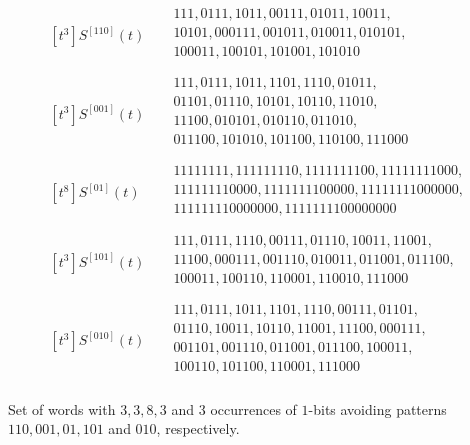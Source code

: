 \begin{table}
$$
\begin{array}{c|c}
[t^{3}]S^{[110]}(t) &
\begin{split}
    & 111, 0111, 1011, 00111, 01011, 10011, \\
    & 10101, 000111, 001011, 010011, 010101, \\
    & 100011, 100101, 101001, 101010 \\
\end{split} \\\hline
[t^{3}]S^{[001]}(t) &
\begin{split}
& 111, 0111, 1011, 1101, 1110, 01011, \\
& 01101, 01110, 10101, 10110, 11010, \\
& 11100, 010101, 010110, 011010,\\
& 011100, 101010, 101100, 110100, 111000 \\
\end{split} \\\hline
[t^{8}]S^{[01]}(t) &
\begin{split}
& 11111111, 111111110, 1111111100, 11111111000, \\
& 111111110000, 1111111100000, 11111111000000, \\
& 111111110000000, 1111111100000000 \\
\end{split} \\\hline
[t^{3}]S^{[101]}(t) &
\begin{split}
& 111, 0111, 1110, 00111, 01110, 10011, 11001, \\
& 11100, 000111, 001110, 010011, 011001, 011100,\\
& 100011, 100110, 110001, 110010, 111000 \\
\end{split} \\\hline
[t^{3}]S^{[010]}(t) &
\begin{split}
& 111, 0111, 1011, 1101, 1110, 00111, 01101, \\
& 01110, 10011, 10110, 11001, 11100, 000111, \\
& 001101, 001110, 011001, 011100, 100011, \\
& 100110, 101100, 110001, 111000 \\
\end{split}
\end{array}
$$
\caption{Set of words with $3, 3, 8, 3$ and $3$ occurrences of $1$-bits
avoiding patterns $110, 001, 01, 101$ and $010$, respectively.}
\end{table}

